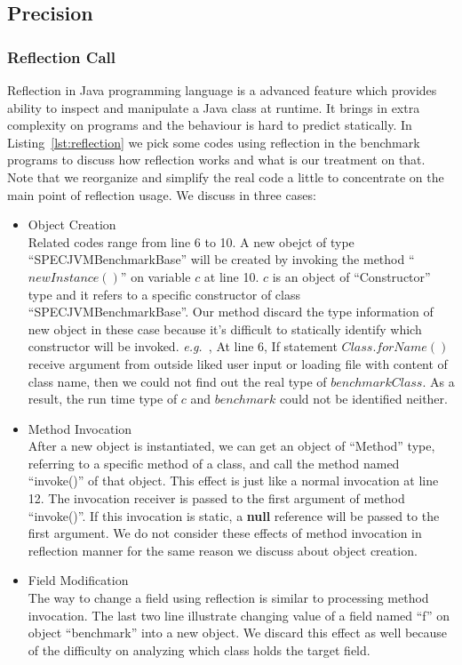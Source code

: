 \documentclass{fac}
\newcommand\eg{\textit{e.g.\ }}
\begin{document}
\subsection{Precision}\label{subsec:precision}
\subsubsection{Reflection Call}\label{subsubsec:reflection-call}
Reflection in Java programming language is a advanced feature which provides ability to inspect and manipulate a Java class at runtime. It brings in extra complexity on programs and the behaviour is hard to predict statically. In Listing~\ref{lst:reflection} we pick some codes using reflection in the benchmark programs to discuss how reflection works and what is our treatment on that. Note that we reorganize and simplify the real code a little to concentrate on the main point of reflection usage. We discuss in three cases:
\begin{itemize}
\item Object Creation \\
Related codes range from line 6 to 10. A new obejct of type ``SPECJVMBenchmarkBase'' will be created by invoking the method ``$newInstance()$'' on variable $c$ at line 10. $c$ is an object of ``Constructor'' type and it refers to a specific constructor of class ``SPECJVMBenchmarkBase''. Our method discard the type information of new object in these case because it's difficult to statically identify which constructor will be invoked. \eg, At line 6, If statement $Class.forName()$ receive argument from outside liked user input or loading file with content of class name, then we could not find out the real type of $benchmarkClass$. As a result, the run time type of $c$ and $benchmark$ could not be identified neither.
\item Method Invocation\\
After a new object is instantiated, we can get an object of ``Method'' type, referring to a specific method of a class, and call the method named ``invoke()'' of that object. This effect is just like a normal invocation at line 12. The invocation receiver is passed to the first argument of method ``invoke()''. If this invocation is static, a \textbf{null} reference will be passed to the first argument. We do not consider these effects of method invocation in reflection manner for the same reason we discuss about object creation.
\item Field Modification\\
The way to change a field using reflection is similar to processing method invocation. The last two line illustrate changing value of a field named ``f'' on object ``benchmark'' into a new object. We discard this effect as well because of the difficulty on analyzing which class holds the target field.
\end{itemize}
\end{document}
